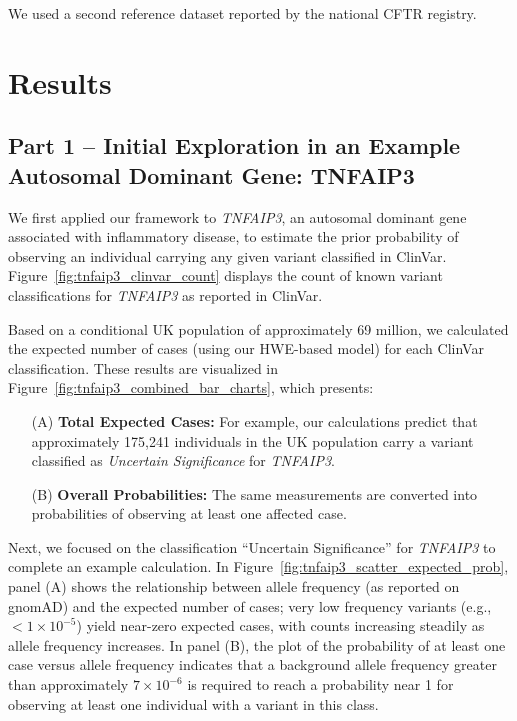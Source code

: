 We used a second reference dataset reported by the national CFTR registry.




\section{Results}

\subsection{Part 1 -- Initial Exploration in an Example Autosomal Dominant Gene: TNFAIP3}
We first applied our framework to \textit{TNFAIP3}, an autosomal dominant gene associated with inflammatory disease, to estimate the prior probability of observing an individual carrying any given variant classified in ClinVar. Figure~\ref{fig:tnfaip3_clinvar_count} displays the count of known variant classifications for \textit{TNFAIP3} as reported in ClinVar. 

Based on a conditional UK population of approximately 69 million, we calculated the expected number of cases (using our HWE-based model) for each ClinVar classification. These results are visualized in Figure~\ref{fig:tnfaip3_combined_bar_charts}, which presents:
\begin{enumerate}
    \item[(A)] \textbf{Total Expected Cases:} For example, our calculations predict that approximately 175,241 individuals in the UK population carry a variant classified as \textit{Uncertain Significance} for \textit{TNFAIP3}.
    \item[(B)] \textbf{Overall Probabilities:} The same measurements are converted into probabilities of observing at least one affected case.
\end{enumerate}

Next, we focused on the classification “Uncertain Significance” for \textit{TNFAIP3} to complete an example calculation. In Figure~\ref{fig:tnfaip3_scatter_expected_prob}, panel (A) shows the relationship between allele frequency (as reported on gnomAD) and the expected number of cases; very low frequency variants (e.g., \(<1\times10^{-5}\)) yield near-zero expected cases, with counts increasing steadily as allele frequency increases. In panel (B), the plot of the probability of at least one case versus allele frequency indicates that a background allele frequency greater than approximately \(7\times10^{-6}\) is required to reach a probability near 1 for observing at least one individual with a variant in this class.

